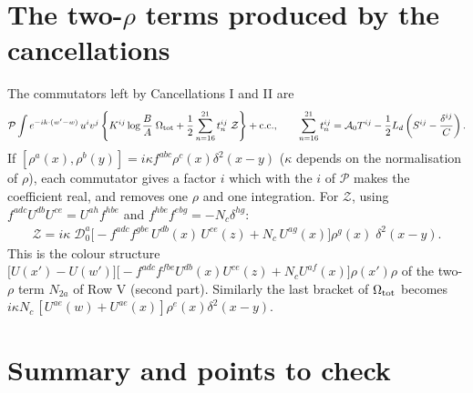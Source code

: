 \documentclass[10pt]{article}
\numberwithin{equation}{section}
\begin{document}
\section{The two-$\rho$ terms produced by the cancellations}\label{sec:comm}

The commutators left by Cancellations I and II are
\begin{align}
\mathcal{P}\int e^{-ik\cdot(w'-w)}\,u^{i}v^{j}\left\{K^{ij}\log\frac{B}{A}\;\Omega_{\rm tot}+\frac12\sum_{n=16}^{21}t_{n}^{ij}\;\mathcal{Z}\right\}+{\rm c.c.},\qquad
\sum_{n=16}^{21}t_{n}^{ij}=\mathcal{A}_{0}T^{ij}-\frac12L_{d}\left(S^{ij}-\frac{\delta^{ij}}{C}\right).
\end{align}
If $[\rho^{a}(x),\rho^{b}(y)]=i\kappa f^{abc}\rho^{c}(x)\delta^{2}(x-y)$ ($\kappa$ depends on the normalisation of $\rho$), each commutator gives a factor $i$ which with the $i$ of $\mathcal{P}$ makes the coefficient real, and removes one $\rho$ and one integration. For $\mathcal{Z}$, using $f^{adc}U^{db}U^{ce}=U^{ah}f^{hbe}$ and $f^{hbe}f^{ebg}=-N_{c}\delta^{hg}$:
\begin{align}
\mathcal{Z}=i\kappa\;\mathcal{D}_{0}^{a}\Big[-f^{adc}f^{gbe}\,U^{db}(x)\,U^{ce}(z)+N_{c}\,U^{ag}(x)\Big]\rho^{g}(x)\;\delta^{2}(x-y).
\end{align}
This is the colour structure $\big[U(x')-U(w')\big]\big[-f^{adc}f^{fbe}U^{db}(x)U^{ce}(z)+N_{c}U^{af}(x)\big]\rho(x')\rho$ of the two-$\rho$ term $N_{2a}$ of Row V (second part). Similarly the last bracket of $\Omega_{\rm tot}$ becomes $i\kappa N_{c}\,[U^{ae}(w)+U^{ae}(x)]\rho^{e}(x)\delta^{2}(x-y)$.

\section{Summary and points to check}
\end{document}
